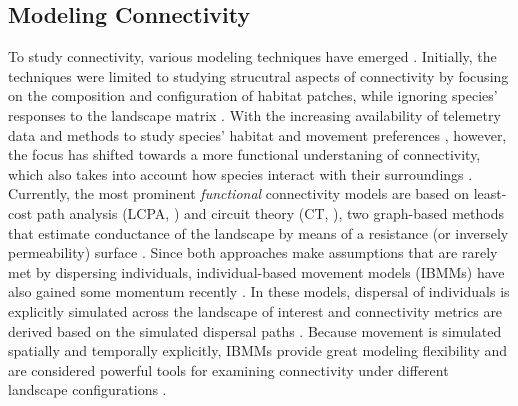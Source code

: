\documentclass[abstract=on,10pt,a4paper,bibliography=totocnumbered]{article}
\begin{document}
\subsection{Modeling Connectivity}
To study connectivity, various modeling techniques have emerged
\cite{Etherington.2016, Diniz.2019}. Initially, the techniques were limited to
studying strucutral aspects of connectivity by focusing on the composition and
configuration of habitat patches, while ignoring species' responses to the
landscape matrix \citep{Tischendorf.2000, Doerr.2011}. With the increasing
availability of telemetry data and methods to study species' habitat and
movement preferences \citep{Boyce.2002, Fortin.2009, Cushman.2010, Avgar.2016},
however, the focus has shifted towards a more functional understaning of
connectivity, which also takes into account how species interact with their
surroundings \citep{Tischendorf.2000, Doerr.2011}. Currently, the most prominent
\textit{functional} connectivity models are based on least-cost path analysis
(LCPA, \citealp{Adriaensen.2003}) and circuit theory (CT, \citealp{McRae.2008}),
two graph-based methods that estimate conductance of the landscape by means of a
resistance (or inversely permeability) surface \citep{Zeller.2012}. Since both
approaches make assumptions that are rarely met by dispersing individuals,
individual-based movement models (IBMMs) have also gained some momentum recently
\citep{Kanagaraj.2013, Allen.2016, Hauenstein.2019, Diniz.2019, Zeller.2020,
UnnithanKumar.2022, UnnithanKumar.2022a, Hofmann.2022}. In these models,
dispersal of individuals is explicitly simulated across the landscape of
interest and connectivity metrics are derived based on the simulated dispersal
paths \citep{Diniz.2019}. Because movement is simulated spatially and temporally
explicitly, IBMMs provide great modeling flexibility and are considered powerful
tools for examining connectivity under different landscape configurations
\citep{Littlefield.2019, UnnithanKumar.2022a}.
\end{document}
